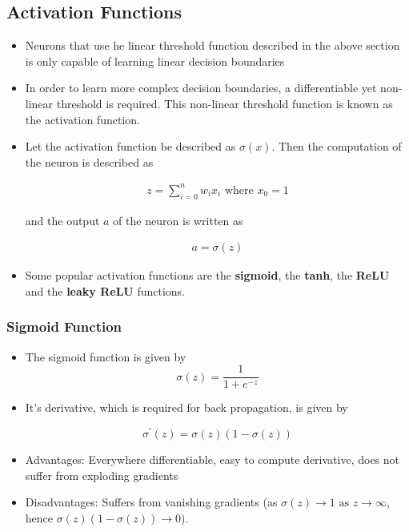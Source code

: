 \documentclass{article}
\theoremstyle{plain}
\theoremstyle{definition}
\begin{document}
\subsection{Activation Functions}
\begin{itemize}
    \item Neurons that use he linear threshold function described in the above section is only capable of learning linear decision boundaries
    
    \item In order to learn more complex decision boundaries, a differentiable yet non-linear threshold is required. This non-linear threshold function is known as the activation function.
    
    \item Let the activation function be described as $\sigma(x)$. Then the computation of the neuron is described as
    
    \begin{align*}
        z = \sum_{i=0}^{n} w_i x_i \text{ where } x_0 = 1
    \end{align*}
    
    and the output $a$ of the neuron is written as
    
    \begin{align*}
        a = \sigma(z)
    \end{align*}
    
    \item Some popular activation functions are the \textbf{sigmoid}, the \textbf{tanh}, the \textbf{ReLU} and the \textbf{leaky ReLU} functions.
\end{itemize}

\subsubsection{Sigmoid Function}
\begin{itemize}
    \item The sigmoid function is given by
    \begin{equation*}
        \sigma(z) = \frac{1}{1+e^{-z}}
    \end{equation*}
    
    \item It's derivative, which is required for back propagation, is given by
    
    \begin{equation*}
        \sigma^{\prime} (z) = \sigma(z) ( 1- \sigma(z))
    \end{equation*}
    
    \item Advantages: Everywhere differentiable, easy to compute derivative, does not suffer from exploding gradients
    
    \item Disadvantages: Suffers from vanishing gradients (as $\sigma(z) \rightarrow 1 \text{ as } z \rightarrow \infty$, hence $\sigma(z)(1-\sigma(z)) \rightarrow 0$).
\end{itemize}
\end{document}
